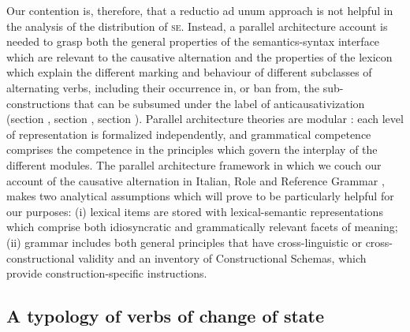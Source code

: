 \documentclass[output=paper,colorlinks,citecolor=brown
]{langscibook}
\begin{document}
Our contention is, therefore, that a reductio ad unum approach is not helpful in the analysis of the distribution of \textsc{se}. Instead, a parallel architecture account is needed to grasp both the general properties of the semantics-syntax interface which are relevant to the causative alternation and the properties of the lexicon which explain the different marking and behaviour of different subclasses of alternating verbs, including their occurrence in, or ban from, the sub-constructions that can be subsumed under the label of anticausativization (section , section , section ). Parallel architecture theories are modular \citep{jackendoff2002foundations}: each level of representation is formalized independently, and grammatical competence comprises the competence in the principles which govern the interplay of the different modules. The parallel architecture framework in which we couch our account of the causative alternation in Italian, Role and Reference Grammar \citep[and references therein]{vanvalin2023principles}, makes two analytical assumptions which will prove to be particularly helpful for our purposes: (i) lexical items are stored with lexical-semantic representations which comprise both idiosyncratic and grammatically relevant facets of meaning; (ii) grammar includes both general principles that have cross-linguistic or cross-constructional validity and an inventory of Constructional Schemas, which provide construction-specific instructions. 

\subsection{A typology of verbs of change of state}
\label{bentley_section_5.2}
\end{document}
